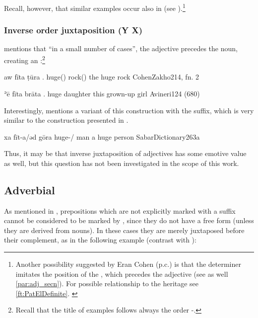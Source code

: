 Recall, however, that similar examples occur also in \Syr (see ).\footnote{Another possibility suggested by Eran Cohen (p.c.) is that the determiner imitates the position of the \Kur \lnk* \ez*, which precedes the adjective (see  as well \vref{par:adj_secn}). For possible relationship to the  heritage see \vref{ft:PatElDefinite}. \label{ft:ex462}} 




\subsubsection{Inverse order juxtaposition (Y X)}

\citet[214, fn. 2]{CohenZakho} mentions that \enquote{in a small number of cases}, the adjective precedes the noun, creating  an :\footnote{Recall that the title of examples follows always the order \Prim-\Secn.}

{aw fīta ṭūra}
{.\masc{} huge(\invar) rock(\masc)}
{the huge rock\footnotemark}
{CohenZakho}{214, fn. 2}


{ʾē fīta brāta}
{\dem.\fem{} huge daughter}
{this grown-up girl}
{Avineri}{124 (680)}

Interestingly, \citet{SabarDictionary} mentions a variant of this construction with the \cst* suffix, which is very similar to the  construction presented  in .

{xa fīt-a/əd gōra}
{\indef{} huge-\free/\cst{} man}
{a huge person}
{SabarDictionary}{263a}

Thus, it may be that {inverse juxtaposition} of adjectives has some {emotive} value as well, but this question has not been investigated in the scope of this work. 

\subsection{Adverbial \prims} \label{ss:JZax_Juxt_Adv_head}

As mentioned in , prepositions which are not explicitly marked with a \cst* \ed suffix cannot be considered to be marked by , since they do not have a free form (unless they are derived from  nouns). In these cases they are merely juxtaposed before their complement, as in the following example (contrast with ):

